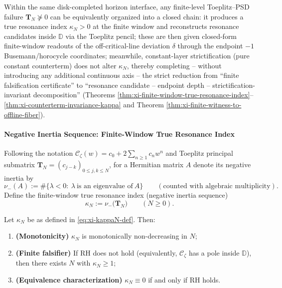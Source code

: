 

\begin{theorem}\label{thm:xi-toeplitz-failure-closed-chain}
Within the same disk-completed horizon interface, any finite-level Toeplitz--PSD failure \(\mathbf{T}_N\nsucceq 0\) can be equivalently organized into a closed chain: it produces a true resonance index \(\kappa_N>0\) at the finite window and reconstructs resonance candidates inside \(\mathbb{D}\) via the Toeplitz pencil; these are then given closed-form finite-window readouts of the off-critical-line deviation \(\delta\) through the endpoint \(-1\) Busemann/horocycle coordinates; meanwhile, constant-layer strictification (pure constant counterterm) does not alter \(\kappa_N\), thereby completing -- without introducing any additional continuous axis -- the strict reduction from ``finite falsification certificate'' to ``resonance candidate -- endpoint depth -- strictification-invariant decomposition'' (Theorems \ref{thm:xi-finite-window-true-resonance-index}--\ref{thm:xi-counterterm-invariance-kappa} and Theorem \ref{thm:xi-finite-witness-to-offline-fiber}).
\end{theorem}

\paragraph{Negative Inertia Sequence: Finite-Window True Resonance Index}
Following the notation \(\mathscr{C}_{\zeta}(w)=c_0+2\sum_{n\ge 1}c_n w^n\) and Toeplitz principal submatrix \(\mathbf{T}_N=(c_{j-k})_{0\le j,k\le N}\),
for a Hermitian matrix \(A\) denote its negative inertia by
\[
\nu_-(A):=\#\{\lambda<0:\ \lambda\ \text{is an eigenvalue of}\ A\}\qquad(\text{counted with algebraic multiplicity}).
\]
Define the finite-window true resonance index (negative inertia sequence)
\begin{equation}\label{eq:xi-kappaN-def}
\boxed{\ \kappa_N:=\nu_-\!\bigl(\mathbf{T}_N\bigr)\qquad(N\ge 0).\ }
\end{equation}

\begin{theorem}\label{thm:xi-finite-window-true-resonance-index}
Let \(\kappa_N\) be as defined in \eqref{eq:xi-kappaN-def}. Then:
\begin{enumerate}
  \item \textbf{(Monotonicity)} \(\kappa_N\) is monotonically non-decreasing in \(N\);
  \item \textbf{(Finite falsifier)} If RH does not hold (equivalently, \(\mathscr{C}_{\zeta}\) has a pole inside \(\mathbb{D}\)), then there exists \(N\) with \(\kappa_N\ge 1\);
  \item \textbf{(Equivalence characterization)} \(\kappa_N\equiv 0\) if and only if RH holds.
\end{enumerate}
\end{theorem}

